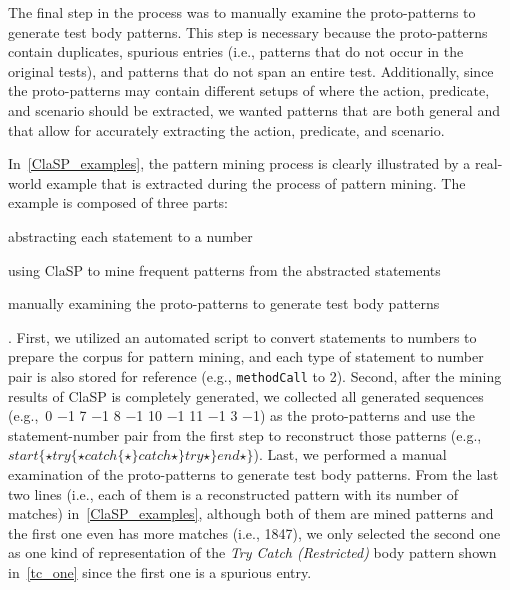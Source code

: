 \documentclass[proposal.tex]{subfiles}
\begin{document}
The final step in the process was to manually examine the proto-patterns to generate test body patterns.
%
This step is necessary because the proto-patterns contain duplicates, spurious entries (i.e., patterns that do not occur in the original tests), and patterns that do not span an entire test.
%
Additionally, since the proto-patterns may contain different setups of where the action, predicate, and scenario should be extracted, we wanted patterns that are both general and that allow for accurately extracting the action, predicate, and scenario.


In~\cref{ClaSP_examples}, the pattern mining process is clearly illustrated by a real-world example that is extracted during the process of pattern mining.
%
The example is composed of three parts:
\begin{enumerate*}
\item abstracting each statement to a number
\item using ClaSP to mine frequent patterns from the abstracted statements
\item manually examining the proto-patterns to generate test body patterns
\end{enumerate*}.
%
First, we utilized an automated script to convert statements to numbers to prepare the corpus for pattern mining, and each type of statement to number pair is also stored for reference (e.g., \texttt{methodCall} to \num{2}).
%
Second, after the mining results of ClaSP is completely generated, we collected all generated sequences (e.g.,~\num{0} \num{-1} \num{7} \num{-1} \num{8} \num{-1} \num{10} \num{-1} \num{11} \num{-1} \num{3} \num{-1}) as the proto-patterns and use the statement-number pair from the first step to reconstruct those patterns (e.g.,~$start\{ \star try\{ \star catch\{ \star \}catch \star \}try \star \}end \star \}$).
%
Last, we performed a manual examination of the proto-patterns to generate test body patterns.
%
From the last two lines (i.e., each of them is a reconstructed pattern with its number of matches) in~\cref{ClaSP_examples}, although both of them are mined patterns and the first one even has more matches (i.e., \num{1847}), we only selected the second one as one kind of representation of the \textit{Try Catch (Restricted)} body pattern shown in~\cref{tc_one} since the first one is a spurious entry.
\end{document}
